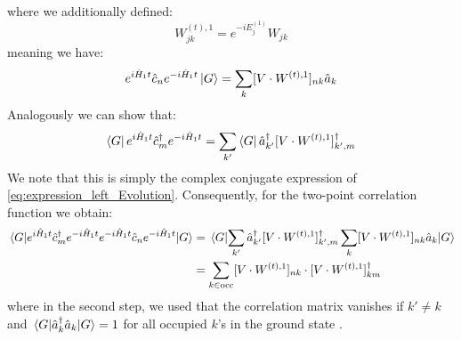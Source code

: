\documentclass[11pt, a4paper, oneside]{book}
\theoremstyle{definition} %
\begin{document}
	where we additionally defined:
	\begin{equation}
		W_{jk}^{(t),1} = e^{-i E_j^{(1)}} W_{jk}
	\end{equation}
	meaning we have:
	\begin{equation}
		e^{i \hat{H}_1 t} \hat{c}_n  e^{-i \hat{H}_1 t} \ket{G} = \sum_k [ V\cdot W^{(t), 1}]_{nk} \hat{a}_k
		\label{eq:expression_left_Evolution}
	\end{equation}
	Analogously we can show that:
	\begin{equation}
		\bra{G} e^{i \hat{H}_1 t} \hat{c}_m^\dagger e^{-i \hat{H}_1 t} = \sum_{k'}\bra{G} \hat{a}_{k'}^\dagger [V \cdot W^{(t), 1} ]^\dagger_{k',m}
	\end{equation}
	We note that this is simply the complex conjugate expression of \ref{eq:expression_left_Evolution}. Consequently, for the two-point correlation function we obtain:
	\begin{equation}
	\begin{split}
	\mel{G}{e^{i \hat{H}_1 t} \hat{c}_m^\dagger e^{-i\hat{H}_1 t} e^{-i \hat{H}_1 t} \hat{c}_n e^{-i \hat{H}_1 t}}{G} &= \mel {G}{\sum_{k'}\hat{a}_{k'}^\dagger [ V \cdot W^{(t),1}]_{k',m}^\dagger \sum_k [V \cdot W^{(t),1 } ]_{nk} \hat{a}_k}{G}\\
	&= \sum_{k \in \text{occ}} [ V \cdot W^{(t),1} ]_{nk} \cdot [V\cdot W^{(t),1} ]_{km}^\dagger
	\end{split}
	\end{equation}
	where in the second step, we used that the correlation matrix vanishes if $k' \neq k$ and $\mel{G}{\hat{a}_k^\dagger \hat{a}_k}{G} = 1$ for all occupied $k$'s in the ground state \cite{Xueda}.
	
\end{document}
